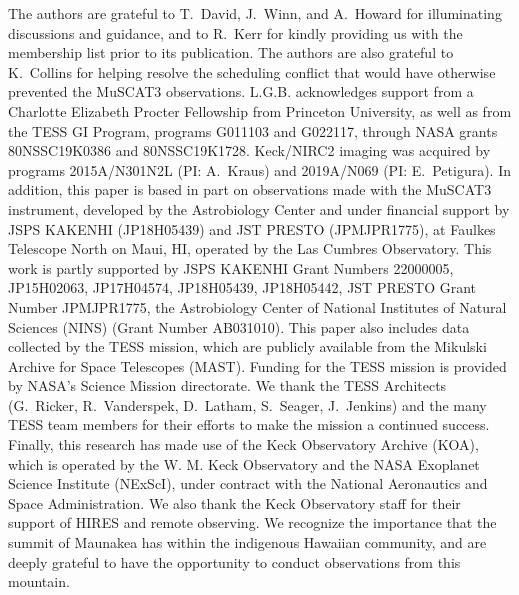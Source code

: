 \documentclass[12pt,modern,twocolumn,tighten]{aastex63}
\begin{document}
The authors are grateful to T{.}~David, J{.}~Winn, and A{.}~Howard for
illuminating discussions and guidance, and to R{.}~Kerr for kindly
providing us with the \citet{Kerr2021} membership list prior to its
publication.
The authors are also grateful to K{.}~Collins for
helping resolve the scheduling conflict that would have otherwise
prevented the MuSCAT3 observations.
%
L.G.B{.} acknowledges support from a Charlotte Elizabeth Procter
Fellowship from Princeton University, as well as from the TESS GI Program, programs
G011103 and G022117, through NASA grants 80NSSC19K0386 and
80NSSC19K1728.
%
%
Keck/NIRC2 imaging was acquired by programs 2015A/N301N2L
(PI: A.~Kraus) and 2019A/N069 (PI: E.~Petigura).
%
In addition, this paper is based in part on observations made with the
MuSCAT3 instrument, developed by the Astrobiology Center and under
financial support by JSPS KAKENHI (JP18H05439) and JST PRESTO
(JPMJPR1775), at Faulkes Telescope North on Maui, HI, operated by the
Las Cumbres Observatory.
%
This work is partly supported by JSPS KAKENHI Grant Numbers 22000005,
JP15H02063, JP17H04574, JP18H05439, JP18H05442, JST PRESTO Grant
Number JPMJPR1775, the Astrobiology Center of National Institutes of
Natural Sciences (NINS) (Grant Number AB031010).
%
%
This paper also includes data collected by the TESS mission, which are
publicly available from the Mikulski Archive for Space Telescopes
(MAST).
%
Funding for the TESS mission is provided by NASA's Science Mission
directorate.
%
We thank the TESS Architects (G.~Ricker, R.~Vanderspek, D.~Latham,
S.~Seager, J.~Jenkins) and the many TESS team members for their
efforts to make the mission a continued success.
%
%
%
%
Finally, this research has made use of the Keck Observatory Archive (KOA),
which is operated by the W. M. Keck Observatory and the NASA Exoplanet
Science Institute (NExScI), under contract with the National
Aeronautics and Space Administration.  We also thank the Keck
Observatory staff for their support of HIRES and remote observing.  We
recognize the importance that the summit of Maunakea has within the
indigenous Hawaiian community, and are deeply grateful to have the
opportunity to conduct observations from this mountain.
%
%
\end{document}
